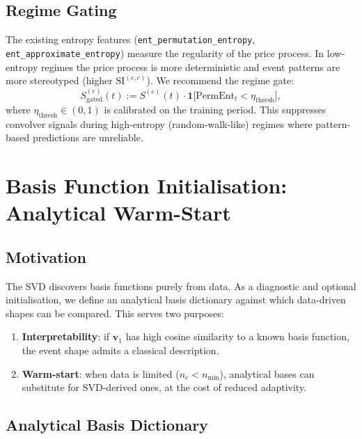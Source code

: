 \documentclass[11pt,a4paper]{article}
\theoremstyle{definition}
\theoremstyle{plain}
\newcommand{\bvec}[1]{\mathbf{#1}}
\begin{document}
\subsection{Regime Gating}

The existing entropy features (\texttt{ent\_permutation\_entropy},
\texttt{ent\_approximate\_entropy}) measure the regularity of the price process. In
low-entropy regimes the price process is more deterministic and event patterns are more
stereotyped (higher $\mathrm{SI}^{(e,c)}$). We recommend the regime gate:
\begin{equation}
    S^{(e)}_{\mathrm{gated}}(t) :=
    S^{(e)}(t) \cdot
    \mathbf{1}\!\bigl[\mathrm{PermEnt}_t < \eta_{\mathrm{thresh}}\bigr],
    \label{eq:regime_gate}
\end{equation}
where $\eta_{\mathrm{thresh}} \in (0,1)$ is calibrated on the training period.
This suppresses convolver signals during high-entropy (random-walk-like) regimes where
pattern-based predictions are unreliable.

\section{Basis Function Initialisation: Analytical Warm-Start}
\label{sec:warmstart}

\subsection{Motivation}

The SVD discovers basis functions purely from data. As a diagnostic and optional
initialisation, we define an analytical basis dictionary against which data-driven shapes
can be compared. This serves two purposes:
\begin{enumerate}
    \item \textbf{Interpretability}: if $\bvec{v}_1$ has high cosine similarity to a
          known basis function, the event shape admits a classical description.
    \item \textbf{Warm-start}: when data is limited ($n_e < n_{\min}$), analytical bases
          can substitute for SVD-derived ones, at the cost of reduced adaptivity.
\end{enumerate}

\subsection{Analytical Basis Dictionary}
\end{document}
